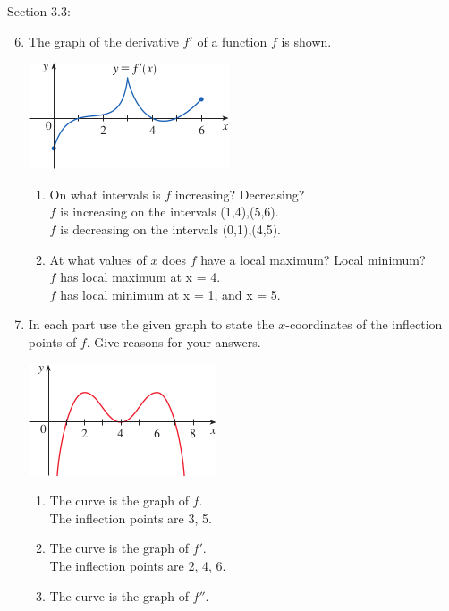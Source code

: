 \documentclass[12pt]{article}
\begin{document}
Section 3.3:


\begin{enumerate}
    \setcounter{enumi}{5}
    \item The graph of the derivative $f'$ of a function $f$ is shown.
    \begin{center}
        \includegraphics{img/img-1.png}
    \end{center}
    \begin{enumerate}
        \item On what intervals is $f$ increasing? Decreasing?\\
        $f$ is increasing on the intervals (1,4),(5,6).\\
        $f$ is decreasing on the intervals (0,1),(4,5).
        \item At what values of $x$ does $f$ have a local maximum? Local minimum?\\
        $f$ has local maximum at x = 4.\\
        $f$ has local minimum at x = 1, and x = 5.
    \end{enumerate}
    \item In each part use the given graph to state the $x$-coordinates of the inflection points of $f$. Give reasons for your answers.
    \begin{center}
        \includegraphics{img/img-2.png}
    \end{center}
    \begin{enumerate}
        \item The curve is the graph of $f$.\\
        The inflection points are 3, 5.
        \item The curve is the graph of $f'$.\\
        The inflection points are 2, 4, 6.
        \item The curve is the graph of $f''$.\\

\end{enumerate}
\end{enumerate}
\end{document}
